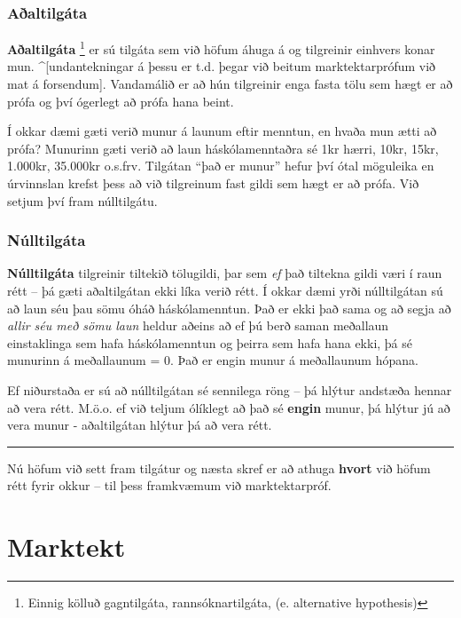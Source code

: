 \documentclass[
]{book}
\begin{document}
\hypertarget{auxf0altilguxe1ta}{%
\subsection{Aðaltilgáta}\label{auxf0altilguxe1ta}}

\textbf{Aðaltilgáta} \footnote{Einnig kölluð gagntilgáta, rannsóknartilgáta, (e.
  alternative hypothesis)} er sú tilgáta sem við höfum áhuga
á og tilgreinir einhvers konar mun. \^{}{[}undantekningar á þessu er t.d.
þegar við beitum marktektarprófum við mat á forsendum{]}. Vandamálið er að
hún tilgreinir enga fasta tölu sem hægt er að prófa og því ógerlegt að
prófa hana beint.

Í okkar dæmi gæti verið munur á launum eftir menntun, en hvaða mun ætti
að prófa? Munurinn gæti verið að laun háskólamenntaðra sé 1kr hærri,
10kr, 15kr, 1.000kr, 35.000kr o.s.frv. Tilgátan ``það er munur'' hefur því
ótal möguleika en úrvinnslan krefst þess að við tilgreinum fast gildi
sem hægt er að prófa. Við setjum því fram núlltilgátu.

\hypertarget{nuxfalltilguxe1ta}{%
\subsection{Núlltilgáta}\label{nuxfalltilguxe1ta}}

\textbf{Núlltilgáta} tilgreinir tiltekið tölugildi, þar sem \emph{ef} það tiltekna
gildi væri í raun rétt -- þá gæti aðaltilgátan ekki líka verið rétt. Í
okkar dæmi yrði núlltilgátan sú að laun séu þau sömu óháð
háskólamenntun. Það er ekki það sama og að segja að \emph{allir séu með sömu
laun} heldur aðeins að ef þú berð saman meðallaun einstaklinga sem hafa
háskólamenntun og þeirra sem hafa hana ekki, þá sé munurinn á
meðallaunum = 0. Það er engin munur á meðallaunum hópana.

Ef niðurstaða er sú að núlltilgátan sé sennilega röng -- þá hlýtur
andstæða hennar að vera rétt. M.ö.o. ef við teljum ólíklegt að það sé
\textbf{engin} munur, þá hlýtur jú að vera munur - aðaltilgátan hlýtur þá að
vera rétt.

\begin{center}\rule{0.5\linewidth}{0.5pt}\end{center}

Nú höfum við sett fram tilgátur og næsta skref er að athuga \textbf{hvort}
við höfum rétt fyrir okkur -- til þess framkvæmum við marktektarpróf.

\hypertarget{marktekt}{%
\chapter{Marktekt}\label{marktekt}}
\end{document}
